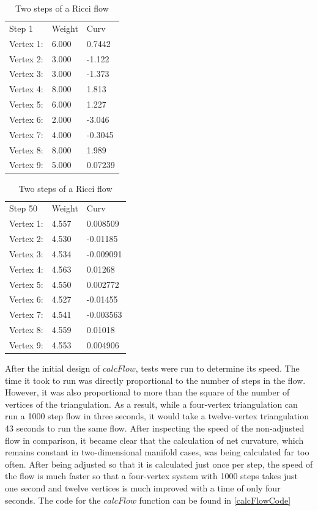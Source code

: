 \documentclass[12pt]{article}
\begin{document}
\begin{table}
\begin{center}
\begin{minipage}{2.2in}
\begin{tabular}{l|l|l}
\hline
Step 1   & Weight &  Curv\\
Vertex 1:& 6.000 & 0.7442\\
Vertex 2: &3.000 & -1.122\\
Vertex 3:& 3.000 & -1.373\\
Vertex 4:& 8.000 & 1.813\\
Vertex 5: &6.000 & 1.227\\
Vertex 6: &2.000 & -3.046\\
Vertex 7: &4.000 & -0.3045\\
Vertex 8: &8.000 & 1.989\\
Vertex 9: &5.000 & 0.07239\\ \hline
\end{tabular} 
\end{minipage}
\begin{minipage}{2.2in}
\begin{tabular}{l|l|l}
\hline
Step 50 &  Weight &  Curv\\
Vertex 1:& 4.557 & 0.008509\\
Vertex 2: &4.530 & -0.01185\\
Vertex 3: &4.534 & -0.009091\\
Vertex 4:& 4.563 & 0.01268\\
Vertex 5:& 4.550 & 0.002772\\
Vertex 6: &4.527 & -0.01455\\
Vertex 7: &4.541 & -0.003563\\
Vertex 8: &4.559 & 0.01018\\
Vertex 9: &4.553 & 0.004906\\ \hline
\end{tabular}
\end{minipage}
\end{center}
\caption{Two steps of a Ricci flow}
\label{tab:ricciSteps}
\end{table}

\noindent After the initial design of $calcFlow$, tests were run to determine its speed. The time it took to run was directly proportional to the number of steps in the flow. However, it was also proportional to more than the square of the number of vertices of the triangulation. As a result, while a four-vertex triangulation can run a 1000 step flow in three seconds, it would take a twelve-vertex triangulation 43 seconds to run the same flow. After inspecting the speed of the non-adjusted flow in comparison, it became clear that the calculation of net curvature, which remains constant in two-dimensional manifold cases, was being calculated far too often. After being adjusted so that it is calculated just once per step, the speed of the flow is much faster so that a four-vertex system with 1000 steps takes just one second and twelve vertices is much improved with a time of only four seconds. The code for the $calcFlow$ function can be found in \ref{calcFlowCode}
\end{document}
